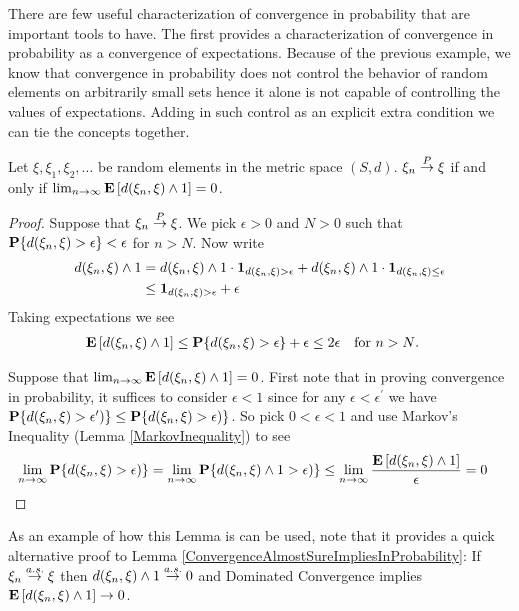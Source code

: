 There are few useful characterization of convergence in probability
that are important tools to have.  The first provides a
characterization of convergence in probability as a convergence of
expectations.  Because of the previous example, we know that
convergence in probability does not control the behavior of random
elements on arbitrarily small sets hence it alone is not capable of
controlling the values of expectations.  Adding in such control as an
explicit extra condition we can tie the concepts together.
\begin{lem}\label{ConvergenceInProbabilityAsConvergenceInExpectation}Let $\xi, \xi_1, \xi_2, \dots$ be random elements in the
  metric space $(S,d)$.  $\xi_n \overset{P}\to \xi$ if and only if
  $\lim_{n \to \infty} \textbf{E}\left[d(\xi_n,\xi) \wedge 1\right] = 0$.
\end{lem}
\begin{proof}Suppose that $\xi_n \overset{P}\to \xi$.  We pick
  $\epsilon > 0$ and $N > 0$ such that
  $\textbf{P}\{d(\xi_n,\xi) > \epsilon\} < \epsilon$ for $n > N$.
Now write
\begin{align*}
d(\xi_n,\xi) \wedge 1 &= d(\xi_n,\xi)
  \wedge 1 \cdot \textbf{1}_{d(\xi_n,\xi) > \epsilon} + d(\xi_n,\xi)
  \wedge 1 \cdot \textbf{1}_{d(\xi_n,\xi) \leq \epsilon} \\
&\leq \textbf{1}_{d(\xi_n,\xi) > \epsilon} + \epsilon
\end{align*}
Taking expectations we see
\begin{align*}
\textbf{E}\left[d(\xi_n,\xi) \wedge 1\right] &\leq \textbf{P}\{d(\xi_n,\xi) >
  \epsilon\} + \epsilon \leq 2\epsilon & & \text{for $n > N$.}
\end{align*}

Suppose that $\lim_{n \to \infty} \textbf{E}\left[d(\xi_n,\xi) \wedge
  1\right] = 0$.  First note that in proving convergence in probability, it
suffices to consider $\epsilon < 1$ since for any $\epsilon <
\epsilon^\prime$ we have $\textbf{P}\{d(\xi_n, \xi) >
  \epsilon^\prime)\} \leq \textbf{P}\{d(\xi_n, \xi) >
  \epsilon)\}$.  So pick $0 < \epsilon < 1$ and use Markov's Inequality
(Lemma \ref{MarkovInequality}) to see
\begin{align*}
\lim_{n \to \infty} \textbf{P}\{d(\xi_n, \xi) >
  \epsilon)\} &= \lim_{n \to \infty}\textbf{P}\{d(\xi_n, \xi) \wedge 1 >
  \epsilon)\} \leq \lim_{n \to \infty} \frac{\textbf{E}\left[d(\xi_n,\xi) \wedge
  1\right]}{\epsilon} = 0
\end{align*}
\end{proof}

As an example of how this Lemma is can be used, note that it provides a quick alternative proof to Lemma
\ref{ConvergenceAlmostSureImpliesInProbability}:  If $\xi_n \overset{a.s.}\to \xi$
then $d(\xi_n, \xi) \wedge 1 \overset{a.s.}\to 0$ and Dominated Convergence
implies $\textbf{E}\left[d(\xi_n, \xi) \wedge 1\right] \to 0$.


